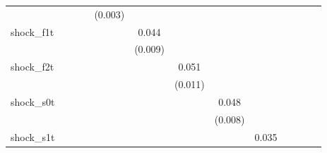 {\begin{tabular}{l*{12}{c}}
            &                     &                     &                     &     (0.003)         &                     &                     &                     &                     &                     &                     &                     &                     \\
\addlinespace
shock\_f1t   &                     &                     &                     &                     &       0.044\sym{***}&                     &                     &                     &                     &                     &                     &                     \\
            &                     &                     &                     &                     &     (0.009)         &                     &                     &                     &                     &                     &                     &                     \\
\addlinespace
shock\_f2t   &                     &                     &                     &                     &                     &       0.051\sym{***}&                     &                     &                     &                     &                     &                     \\
            &                     &                     &                     &                     &                     &     (0.011)         &                     &                     &                     &                     &                     &                     \\
\addlinespace
shock\_s0t   &                     &                     &                     &                     &                     &                     &       0.048\sym{***}&                     &                     &                     &                     &                     \\
            &                     &                     &                     &                     &                     &                     &     (0.008)         &                     &                     &                     &                     &                     \\
\addlinespace
shock\_s1t   &                     &                     &                     &                     &                     &                     &                     &       0.035\sym{***}&                     &                     &                     &                     \\

\end{tabular}}
